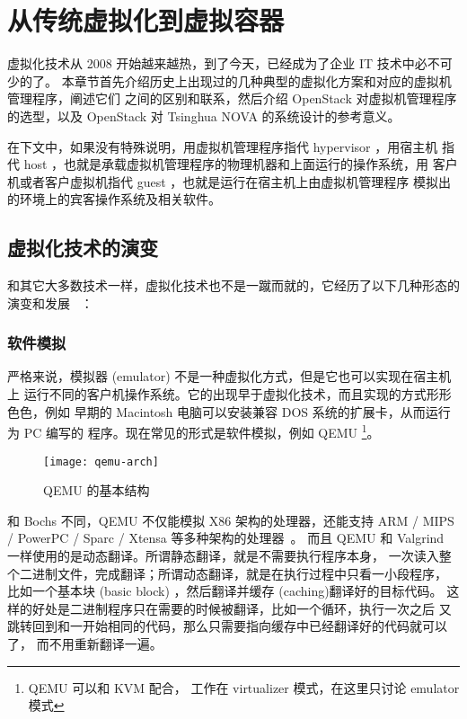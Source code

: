 \chapter{从传统虚拟化到虚拟容器}
\label{cha:virtualization-and-container}

虚拟化技术从 2008 开始越来越热，到了今天，已经成为了企业 IT 技术中必不可少的了。
本章节首先介绍历史上出现过的几种典型的虚拟化方案和对应的虚拟机管理程序，阐述它们
之间的区别和联系，然后介绍 OpenStack 对虚拟机管理程序的选型，以及 OpenStack
对 Tsinghua NOVA 的系统设计的参考意义。

在下文中，如果没有特殊说明，用虚拟机管理程序指代 hypervisor ，用宿主机
指代 host ，也就是承载虚拟机管理程序的物理机器和上面运行的操作系统，用
客户机或者客户虚拟机指代 guest ，也就是运行在宿主机上由虚拟机管理程序
模拟出的环境上的宾客操作系统及相关软件。

\section{虚拟化技术的演变}

和其它大多数技术一样，虚拟化技术也不是一蹴而就的，它经历了以下几种形态的演变和发展
~\cite{deep-into-kvm}：

\subsection{软件模拟}
\label{emulators}

严格来说，模拟器 (emulator) 不是一种虚拟化方式，但是它也可以实现在宿主机上
运行不同的客户机操作系统。它的出现早于虚拟化技术，而且实现的方式形形色色，例如
早期的 Macintosh 电脑可以安装兼容 DOS 系统的扩展卡，从而运行为 PC 编写的
程序。现在常见的形式是软件模拟，例如 QEMU \footnote{QEMU 可以和 KVM 配合，
工作在 virtualizer 模式，在这里只讨论 emulator 模式}。

\begin{figure}[h]
    \centering
    \texttt{[image: qemu-arch]}
    \caption{QEMU 的基本结构}
\end{figure}

和 Bochs 不同，QEMU 不仅能模拟 X86 架构的处理器，还能支持 ARM / MIPS / PowerPC
 / Sparc / Xtensa 等多种架构的处理器~\cite{qemu-internals}。
而且 QEMU 和 Valgrind 一样使用的是动态翻译。所谓静态翻译，就是不需要执行程序本身，
一次读入整个二进制文件，完成翻译；所谓动态翻译，就是在执行过程中只看一小段程序，
比如一个基本块 (basic block) ，然后翻译并缓存 (caching)翻译好的目标代码。
这样的好处是二进制程序只在需要的时候被翻译，比如一个循环，执行一次之后
又跳转回到和一开始相同的代码，那么只需要指向缓存中已经翻译好的代码就可以了，
而不用重新翻译一遍。

